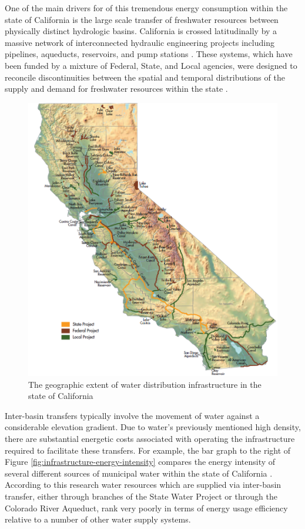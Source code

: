 One of the main drivers for of this tremendous energy consumption within the state of California is the large scale transfer of freshwater resources between physically distinct hydrologic basins. California is crossed latitudinally by a massive network of interconnected hydraulic engineering projects including pipelines, aqueducts, reservoirs, and pump stations \cite{Schwarzenegger2005, Schwarzenegger2005}. These systems, which have been funded by a mixture of Federal, State, and Local agencies, were designed to reconcile discontinuities between the spatial and temporal distributions of the supply and demand for freshwater resources within the state \cite{Freeman2008}.

       \begin{figure}[!h]
       \centering
       \includegraphics[width=5.5in]{figures/infrastructure.png}
       \caption[Characteristics of Water Distribution Infrastructure]{The geographic extent of water distribution infrastructure in the state of California \cite{Schwarzenegger2005}}
       \label{fig:california-distribution}
     \end{figure}
    
Inter-basin transfers typically involve the movement of water against a considerable elevation gradient. Due to water's previously mentioned high density, there are substantial energetic costs associated with operating the infrastructure required to facilitate these transfers. For example, the bar graph to the right of Figure \ref{fig:infrastructure-energy-intensity} compares the energy intensity of several different sources of municipal water within the state of California \cite{Wilkinson2007}. According to this research water resources which are supplied via inter-basin transfer, either through branches of the State Water Project or through the Colorado River Aqueduct, rank very poorly in terms of energy usage efficiency relative to a number of other water supply systems.

